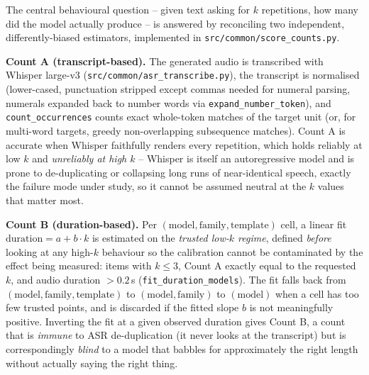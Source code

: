\documentclass[11pt]{article}
\begin{document}
The central behavioural question -- given text asking for $k$ repetitions, how
many did the model actually produce -- is answered by reconciling two
independent, differently-biased estimators, implemented in
\texttt{src/common/score\_counts.py}.

\textbf{Count A (transcript-based).} The generated audio is transcribed with
Whisper large-v3 (\texttt{src/common/asr\_transcribe.py}), the transcript is
normalised (lower-cased, punctuation stripped except commas needed for
numeral parsing, numerals expanded back to number words via
\texttt{expand\_number\_token}), and \texttt{count\_occurrences} counts exact
whole-token matches of the target unit (or, for multi-word targets, greedy
non-overlapping subsequence matches). Count A is accurate when Whisper
faithfully renders every repetition, which holds reliably at low $k$ and
\emph{unreliably at high $k$} -- Whisper is itself an autoregressive model and
is prone to de-duplicating or collapsing long runs of near-identical speech,
exactly the failure mode under study, so it cannot be assumed neutral at the
$k$ values that matter most.

\textbf{Count B (duration-based).} Per $(\text{model}, \text{family},
\text{template})$ cell, a linear fit $\text{duration} = a + b\cdot k$ is
estimated on the \emph{trusted low-$k$ regime}, defined \emph{before} looking
at any high-$k$ behaviour so the calibration cannot be contaminated by the
effect being measured: items with $k\le 3$, Count A exactly equal to the
requested $k$, and audio duration $>0.2\,$s
(\texttt{fit\_duration\_models}). The fit falls back from
$(\text{model},\text{family},\text{template})$ to $(\text{model},\text{family})$
to $(\text{model})$ when a cell has too few trusted points, and is discarded
if the fitted slope $b$ is not meaningfully positive. Inverting the fit at a
given observed duration gives Count B, a count that is \emph{immune} to ASR
de-duplication (it never looks at the transcript) but is correspondingly
\emph{blind} to a model that babbles for approximately the right length
without actually saying the right thing.
\end{document}
